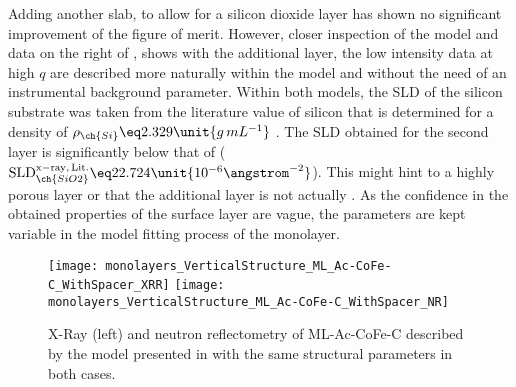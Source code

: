 \documentclass[\main/dresen_thesis.tex]{subfiles}
\begin{document}
  Adding another slab, to allow for a silicon dioxide layer has shown no significant improvement of the figure of merit.
  However, closer inspection of the model and data on the right of , shows  with the additional layer, the low intensity data at high $q$ are described more naturally within the model and without the need of an instrumental background parameter.
  Within both models, the SLD of the silicon substrate was taken from the literature value of silicon that is determined for a density of $\rho_{\ch{Si}} \eq 2.329 \unit{g \, mL^{-1}}$ \cite{Lide_2004_Handb}.
  The SLD obtained for the second layer is significantly below that of  ($\mathrm{SLD}_{\ch{SiO2}}^\mathrm{x-ray, \,Lit.} \eq 22.724 \unit{10^{-6} \angstrom^{-2}}$).
  This might hint to a highly porous layer or that the additional layer is not actually .
  As the confidence in the obtained properties of the surface layer are vague, the parameters are kept variable in the model fitting process of the monolayer.

  \begin{figure}[tb]
    \centering
    \texttt{[image: monolayers\_VerticalStructure\_ML\_Ac-CoFe-C\_WithSpacer\_XRR]}
    \texttt{[image: monolayers\_VerticalStructure\_ML\_Ac-CoFe-C\_WithSpacer\_NR]}
    \caption{\label{fig:monolayers:structure:XRR:ML-Ac-CoFe-C-WithSpacer}X-Ray (left) and neutron
    reflectometry of ML-Ac-CoFe-C described by the model presented in  with the same structural parameters in both cases.}
  \end{figure}
\end{document}
